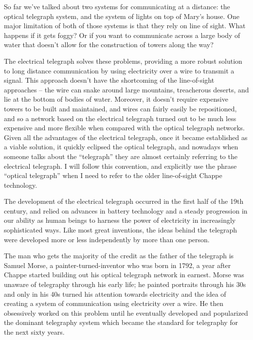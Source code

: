 \documentclass{book}
\begin{document}
So far we've talked about two systems for communicating at a distance: the optical telegraph system, and the system of lights on top of Mary's house. One major limitation of both of those systems is that they rely on line of sight. What happens if it gets foggy? Or if you want to communicate across a large body of water that doesn't allow for the construction of towers along the way?

The electrical telegraph solves these problems, providing a more robust solution to long distance communication by using electricity over a wire to transmit a signal. This approach doesn't have the shortcoming of the line-of-sight approaches – the wire can snake around large mountains, treacherous deserts, and lie at the bottom of bodies of water. Moreover, it doesn't require expensive towers to be built and maintained, and wires can fairly easily be repositioned, and so a network based on the electrical telegraph turned out to be much less expensive and more flexible when compared with the optical telegraph networks. Given all the advantages of the electrical telegraph, once it became established as a viable solution, it quickly eclipsed the optical telegraph, and nowadays when someone talks about the ``telegraph'' they are almost certainly referring to the electrical telegraph. I will follow this convention, and explicitly use the phrase ``optical telegraph'' when I need to refer to the older line-of-sight Chappe technology.

The development of the electrical telegraph occurred in the first half of the 19th century, and relied on advances in battery technology and a steady progression in our ability as human beings to harness the power of electricity in increasingly sophisticated ways. Like most great inventions, the ideas behind the telegraph were developed more or less independently by more than one person.

The man who gets the majority of the credit as the father of the telegraph is Samuel Morse, a painter-turned-inventor who was born in 1792, a year after Chappe started building out his optical telegraph network in earnest. Morse was unaware of telegraphy through his early life; he painted portraits through his 30s and only in his 40s turned his attention towards electricity and the idea of creating a system of communication using electricity over a wire. He then obsessively worked on this problem until he eventually developed and popularized the dominant telegraphy system which became the standard for telegraphy for the next sixty years.
\end{document}
